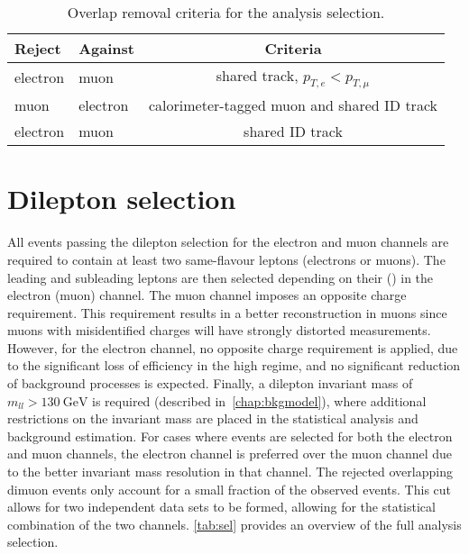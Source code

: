 \begin{table}[]
   \centering
   {
   \begin{tabular}{l|l||c}
 \hline
     Reject & Against & Criteria \\
     \hline
     electron & muon & shared track, $p_{T,e} < p_{T,\mu}$ \\
     muon & electron & calorimeter-tagged muon and shared ID track \\
     electron & muon & shared ID track \\
 \hline
   \end{tabular}
   }
   \caption[Overlap removal criteria for the analysis selection.]{Overlap removal criteria for the analysis selection.}
   \label{tab:sel:overlap}
 \end{table}

\section{Dilepton selection}
All events passing the dilepton selection for the electron and muon channels are required to contain at least two same-flavour leptons (electrons or muons). The leading and subleading leptons are then selected depending on their \et (\pt) in the electron (muon) channel. The muon channel imposes an opposite charge requirement. This requirement results in a better \pt reconstruction in muons since muons with misidentified charges will have strongly distorted \pt measurements. However, for the electron channel, no opposite charge requirement is applied, due to the significant loss of efficiency in the high \et regime, and no significant reduction of background processes is expected. Finally, a dilepton invariant mass of $m_{ll} > \SI{130}{\giga\electronvolt}$ is required (described in~\cref{chap:bkgmodel}), where additional restrictions on the invariant mass are placed in the statistical analysis and background estimation. For cases where events are selected for both the electron and muon channels, the electron channel is preferred over the muon channel due to the better invariant mass resolution in that channel. The rejected overlapping dimuon events only account for a small fraction of the observed events. This cut allows for two independent data sets to be formed, allowing for the statistical combination of the two channels. \cref{tab:sel} provides an overview of the full analysis selection. 

